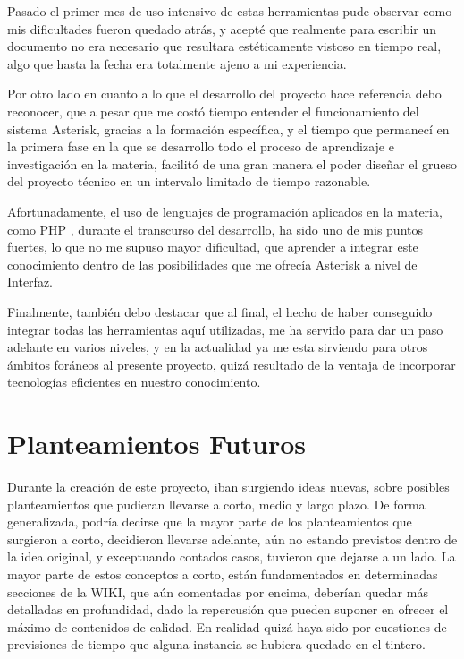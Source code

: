 Pasado el primer mes de uso intensivo de estas herramientas pude observar como mis dificultades fueron quedado atrás, y acepté que realmente para escribir un documento no era necesario que resultara estéticamente vistoso en tiempo real, algo que hasta la fecha era totalmente ajeno a mi experiencia.

Por otro lado en cuanto a lo que el desarrollo del proyecto hace referencia debo reconocer, que a pesar que me costó tiempo entender el funcionamiento del sistema Asterisk, gracias a la formación específica, y el tiempo que permanecí en la primera fase en la que se desarrollo todo el proceso de aprendizaje e investigación en la materia, facilitó de una gran manera el poder diseñar el grueso del proyecto técnico en un intervalo limitado de tiempo razonable.

Afortunadamente, el uso de lenguajes de programación aplicados en la materia, como PHP \cite{website:php} \cite{gilmore10}, durante el transcurso del desarrollo, ha sido uno de mis puntos fuertes, lo que no me supuso mayor dificultad, que aprender a integrar este conocimiento dentro de las posibilidades que me ofrecía Asterisk a nivel de Interfaz.

Finalmente, también debo destacar que al final, el hecho de haber conseguido integrar todas las herramientas aquí utilizadas, me ha servido para dar un paso adelante en varios niveles, y en la actualidad ya me esta sirviendo para otros ámbitos foráneos al presente proyecto, quizá resultado de la ventaja de incorporar tecnologías eficientes en nuestro conocimiento.

\section{Planteamientos Futuros}

Durante la creación de este proyecto, iban surgiendo ideas nuevas, sobre posibles planteamientos que pudieran llevarse a corto, medio y largo plazo. De forma generalizada, podría decirse que la mayor parte de los planteamientos que surgieron a corto, decidieron llevarse adelante, aún no estando previstos dentro de la idea original, y exceptuando contados casos, tuvieron que dejarse a un lado. La mayor parte de estos conceptos a corto, están fundamentados en determinadas secciones de la WIKI, que aún comentadas por encima, deberían quedar más detalladas en profundidad, dado la repercusión que pueden suponer en ofrecer el máximo de contenidos de calidad. En realidad quizá haya sido por cuestiones de previsiones de tiempo que alguna instancia se hubiera quedado en el tintero.

